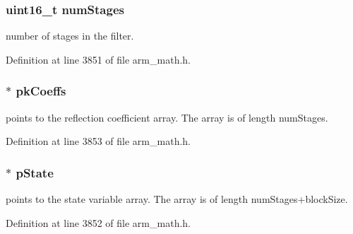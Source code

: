\subsubsection[{\texorpdfstring{num\+Stages}{numStages}}]{\setlength{\rightskip}{0pt plus 5cm}uint16\+\_\+t num\+Stages}\hypertarget{structarm__iir__lattice__instance__q31_a4cceb90547b3e585d4c7aabaa8057212}{}\label{structarm__iir__lattice__instance__q31_a4cceb90547b3e585d4c7aabaa8057212}
number of stages in the filter. 

Definition at line 3851 of file arm\+\_\+math.\+h.

\subsubsection[{\texorpdfstring{pk\+Coeffs}{pkCoeffs}}]{$\ast$ pk\+Coeffs}\hypertarget{structarm__iir__lattice__instance__q31_a9d45339bf841bf86aec57be5f70d2b01}{}\label{structarm__iir__lattice__instance__q31_a9d45339bf841bf86aec57be5f70d2b01}
points to the reflection coefficient array. The array is of length num\+Stages. 

Definition at line 3853 of file arm\+\_\+math.\+h.

\subsubsection[{\texorpdfstring{p\+State}{pState}}]{$\ast$ p\+State}\hypertarget{structarm__iir__lattice__instance__q31_adee4ba3ee8869865af7d8fa08ca913d6}{}\label{structarm__iir__lattice__instance__q31_adee4ba3ee8869865af7d8fa08ca913d6}
points to the state variable array. The array is of length num\+Stages+block\+Size. 

Definition at line 3852 of file arm\+\_\+math.\+h.

